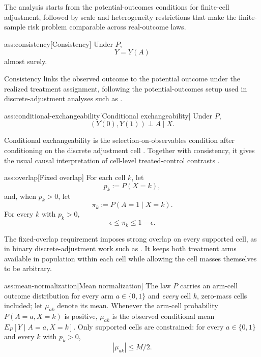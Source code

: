 \documentclass[11pt]{article}
\begin{document}
The analysis starts from the potential-outcomes conditions for finite-cell adjustment, followed by scale and heterogeneity restrictions that make the finite-sample risk problem comparable across real-outcome laws.

\begin{assumptionv}{ass:consistency}[Consistency]
Under \(P\),
\[
Y=Y(A)
\]
almost surely.
\end{assumptionv}

Consistency links the observed outcome to the potential outcome under the realized treatment assignment, following the potential-outcomes setup used in discrete-adjustment analyses such as \citet{ZengBalakrishnanHanKennedy2024}.

\begin{assumptionv}{ass:conditional-exchangeability}[Conditional exchangeability]
Under \(P\),
\[
(Y(0),Y(1))\perp A\mid X .
\]
\end{assumptionv}

Conditional exchangeability is the selection-on-observables condition after conditioning on the discrete adjustment cell \citep{ZengBalakrishnanHanKennedy2024}. Together with consistency, it gives the usual causal interpretation of cell-level treated-control contrasts \citep{Rubin1974,RosenbaumRubin1983,ImbensRubin2015}.

\begin{assumptionv}{ass:overlap}[Fixed overlap]
For each cell \(k\), let
\[
p_k:=P(X=k),
\]
and, when \(p_k>0\), let
\[
\pi_k:=P(A=1\mid X=k).
\]
For every \(k\) with \(p_k>0\),
\[
\epsilon\le \pi_k\le 1-\epsilon .
\]
\end{assumptionv}

The fixed-overlap requirement imposes strong overlap on every supported cell, as in binary discrete-adjustment work such as \citet{ZengBalakrishnanHanKennedy2024}. It keeps both treatment arms available in population within each cell while allowing the cell masses themselves to be arbitrary.

\begin{assumptionv}{ass:mean-normalization}[Mean normalization]
The law \(P\) carries an arm-cell outcome distribution for every arm \(a\in\{0,1\}\) and \emph{every} cell \(k\), zero-mass cells included; let \(\mu_{ak}\) denote its mean.  Whenever the arm-cell probability \(P(A=a,X=k)\) is positive, \(\mu_{ak}\) is the observed conditional mean \(E_P[Y\mid A=a,X=k]\).  Only supported cells are constrained: for every \(a\in\{0,1\}\) and every \(k\) with \(p_k>0\),
\[
|\mu_{ak}|\le M/2 .
\]
\end{assumptionv}
\end{document}
